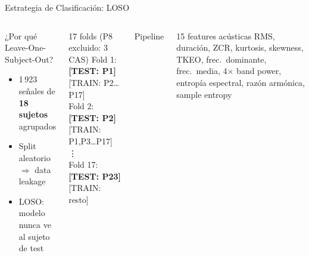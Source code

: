 ﻿\documentclass[aspectratio=169,10pt]{beamer}
\begin{document}
\begin{frame}{Estrategia de Clasificación: LOSO}
  \begin{columns}
      \begin{block}{¿Por qué Leave-One-Subject-Out?}
        \begin{itemize}
          \item 1\,923 señales de \textbf{18 sujetos} agrupados
          \item Split aleatorio $\Rightarrow$ \alert{data leakage}
          \item LOSO: modelo nunca ve al sujeto de test
        \end{itemize}
      \end{block}
      \begin{exampleblock}{17 folds (P8 excluido: 3 CAS)}
        \footnotesize
        Fold 1: \textbf{[TEST: P1]} [TRAIN: P2\ldots P17]\\
        Fold 2: \textbf{[TEST: P2]} [TRAIN: P1,P3\ldots P17]\\
        \hspace{1em}\vdots\\
        Fold 17: \textbf{[TEST: P23]} [TRAIN: resto]
      \end{exampleblock}
      \begin{block}{Pipeline}
        \centering\small
      \end{block}
      \begin{block}{15 features acústicas}
        \footnotesize RMS, duración, ZCR, kurtosis, skewness, TKEO, frec.\ dominante, frec.\ media, 4$\times$ band power, entropía espectral, razón armónica, sample entropy
      \end{block}
  \end{columns}
\end{frame}
\end{document}
